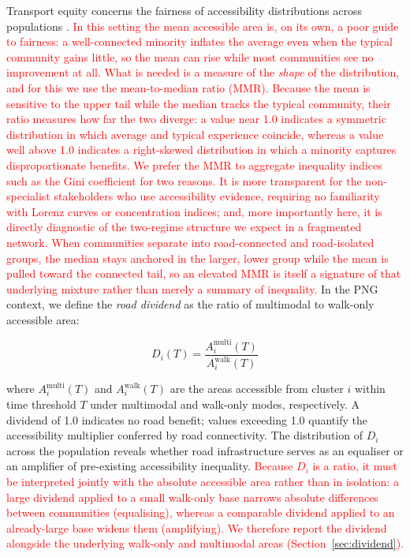 \documentclass[review,3p,authoryear]{elsarticle}
\newcommand{\rev}[1]{\textcolor{red}{#1}}
\begin{document}
Transport equity concerns the fairness of accessibility distributions across populations \citep{pereira2017, lucas2016}. \rev{In this setting the mean accessible area is, on its own, a poor guide to fairness: a well-connected minority inflates the average even when the typical community gains little, so the mean can rise while most communities see no improvement at all. What is needed is a measure of the \textit{shape} of the distribution, and for this we use the mean-to-median ratio (MMR). Because the mean is sensitive to the upper tail while the median tracks the typical community, their ratio measures how far the two diverge: a value near 1.0 indicates a symmetric distribution in which average and typical experience coincide, whereas a value well above 1.0 indicates a right-skewed distribution in which a minority captures disproportionate benefits. We prefer the MMR to aggregate inequality indices such as the Gini coefficient for two reasons. It is more transparent for the non-specialist stakeholders who use accessibility evidence, requiring no familiarity with Lorenz curves or concentration indices; and, more importantly here, it is directly diagnostic of the two-regime structure we expect in a fragmented network. When communities separate into road-connected and road-isolated groups, the median stays anchored in the larger, lower group while the mean is pulled toward the connected tail, so an elevated MMR is itself a signature of that underlying mixture rather than merely a summary of inequality.} In the PNG context, we define the \textit{road dividend} as the ratio of multimodal to walk-only accessible area:

\begin{equation}
D_i(T) = \frac{A_i^{\text{multi}}(T)}{A_i^{\text{walk}}(T)}
\label{eq:dividend}
\end{equation}

\noindent where $A_i^{\text{multi}}(T)$ and $A_i^{\text{walk}}(T)$ are the areas accessible from cluster $i$ within time threshold $T$ under multimodal and walk-only modes, respectively. A dividend of 1.0 indicates no road benefit; values exceeding 1.0 quantify the accessibility multiplier conferred by road connectivity. The distribution of $D_i$ across the population reveals whether road infrastructure serves as an equaliser or an amplifier of pre-existing accessibility inequality. \rev{Because $D_i$ is a ratio, it must be interpreted jointly with the absolute accessible area rather than in isolation: a large dividend applied to a small walk-only base narrows absolute differences between communities (equalising), whereas a comparable dividend applied to an already-large base widens them (amplifying). We therefore report the dividend alongside the underlying walk-only and multimodal areas (Section~\ref{sec:dividend}).}
\end{document}
